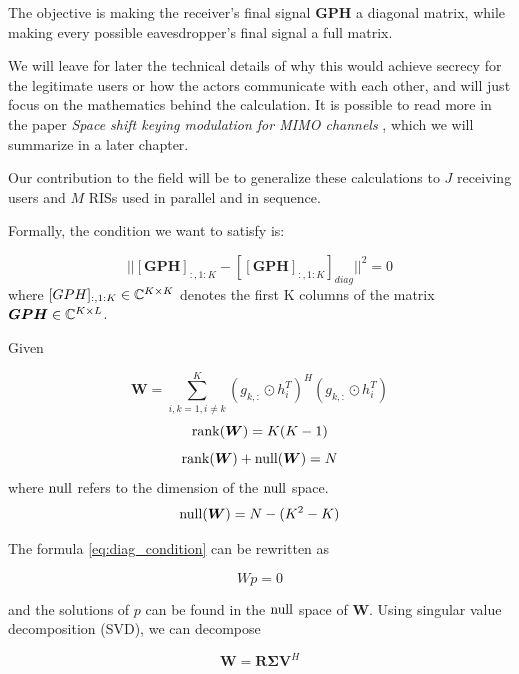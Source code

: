The objective is making the receiver's final signal $\bm{GPH}$ a diagonal matrix, while making every possible eavesdropper's final signal a full matrix.

We will leave for later the technical details of why this would achieve secrecy for the legitimate users or how the actors communicate with each other, and will just focus on the mathematics behind the calculation. It is possible to read more in the paper \textit{Space shift keying modulation for MIMO channels} \cite{5165332}, which we will summarize in a later chapter.

Our contribution to the field will be to generalize these calculations to $J$ receiving users and $M$ RISs used in parallel and in sequence.

Formally, the condition we want to satisfy is:

\begin{equation}
  || [\bm{GPH}]_{:,1:K} - [[\bm{GPH}]_{:,1:K}]_{diag} || ^2 = 0
  \label{eq:diag_condition}
\end{equation}
where $[GPH]_{:,1:K} \in \mathbb{C}^{K \times K}$ denotes the first K columns of the matrix $\bm{GPH} \in \mathbb{C}^{K \times L}$.

Given

\begin{equation}
  \bm{W} = \sum_{i,k = 1, i \ne k}^{K} (g_{k,:} \odot h_i^T)^H (g_{k,:} \odot h_i^T)
\end{equation}
\begin{equation}
  \operatorname{rank}(\bm{W}) = K(K-1)
\end{equation}
\begin{equation}
  \operatorname{rank}(\bm{W}) + \operatorname{null}(\bm{W}) = N
\end{equation}
where $\operatorname{null}$ refers to the dimension of the $\operatorname{null}$ space.
\begin{equation}
  \operatorname{null}(\bm{W}) = N - (K^2 - K)
\end{equation}

The formula \eqref{eq:diag_condition} can be rewritten as

\begin{equation}Wp = 0\end{equation}

and the solutions of $p$ can be found in the $\operatorname{null}$ space of $\bm{W}$. Using singular value decomposition (SVD), we can decompose

\begin{equation}
  \bm{W} = \bm{R \Sigma V}^H
\end{equation}

